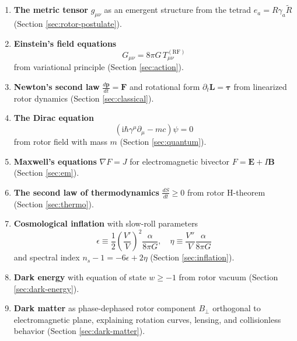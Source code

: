 \documentclass[11pt,a4paper]{article}
\numberwithin{equation}{section}
\theoremstyle{plain}
\theoremstyle{definition}
\theoremstyle{remark}
\newcommand{\rev}[1]{\widetilde{#1}}       %
\newcommand{\ii}{\mathrm{i}}
\begin{document}
\begin{enumerate}
\item \textbf{The metric tensor} $g_{\mu\nu}$ as an emergent structure from the tetrad $e_a = R\gamma_a\rev{R}$ (Section \ref{sec:rotor-postulate}).

\item \textbf{Einstein's field equations}
\begin{equation*}
G_{\mu\nu} = 8\pi G\, T_{\mu\nu}^{(\mathrm{RF})}
\end{equation*}
from variational principle (Section \ref{sec:action}).

\item \textbf{Newton's second law} $\frac{d\mathbf{p}}{dt} = \mathbf{F}$ and rotational form $\partial_t\bm{L} = \bm{\tau}$ from linearized rotor dynamics (Section \ref{sec:classical}).

\item \textbf{The Dirac equation}
\begin{equation*}
(\ii\hbar\gamma^\mu\partial_\mu - mc)\psi = 0
\end{equation*}
from rotor field with mass $m$ (Section \ref{sec:quantum}).

\item \textbf{Maxwell's equations} $\nabla F = J$ for electromagnetic bivector $F = \mathbf{E} + I\mathbf{B}$ (Section \ref{sec:em}).

\item \textbf{The second law of thermodynamics} $\frac{dS}{dt} \geq 0$ from rotor H-theorem (Section \ref{sec:thermo}).

\item \textbf{Cosmological inflation} with slow-roll parameters
\begin{equation*}
\epsilon \equiv \frac{1}{2}\left(\frac{V'}{V}\right)^2\frac{\alpha}{8\pi G}, \quad \eta \equiv \frac{V''}{V}\frac{\alpha}{8\pi G}
\end{equation*}
and spectral index $n_s - 1 = -6\epsilon + 2\eta$ (Section \ref{sec:inflation}).

\item \textbf{Dark energy} with equation of state $w \geq -1$ from rotor vacuum (Section \ref{sec:dark-energy}).

\item \textbf{Dark matter} as phase-dephased rotor component $B_\perp$ orthogonal to electromagnetic plane, explaining rotation curves, lensing, and collisionless behavior (Section \ref{sec:dark-matter}).
\end{enumerate}
\end{document}
